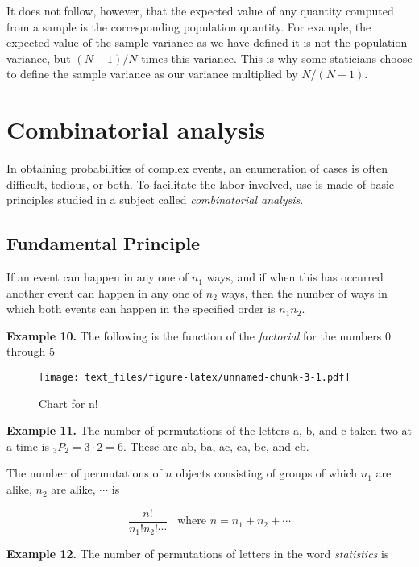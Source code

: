 \documentclass[
]{article}
\begin{document}
It does not follow, however, that the expected value of any quantity
computed from a sample is the corresponding population quantity. For
example, the expected value of the sample variance as we have defined it
is not the population variance, but \((N-1)/N\) times this variance.
This is why some staticians choose to define the sample variance as our
variance multiplied by \(N/(N-1)\).

\hypertarget{combinatorial-analysis}{%
\section{Combinatorial analysis}\label{combinatorial-analysis}}

In obtaining probabilities of complex events, an enumeration of cases is
often difficult, tedious, or both. To facilitate the labor involved, use
is made of basic principles studied in a subject called
\emph{combinatorial analysis}.

\hypertarget{fundamental-principle}{%
\subsection{Fundamental Principle}\label{fundamental-principle}}

If an event can happen in any one of \(n_1\) ways, and if when this has
occurred another event can happen in any one of \(n_2\) ways, then the
number of ways in which both events can happen in the specified order is
\(n_1 n_2\).

\textbf{Example 10.} The following is the function of the
\emph{factorial} for the numbers 0 through 5

\begin{figure}
\centering
\texttt{[image: text\_files/figure-latex/unnamed-chunk-3-1.pdf]}
\caption{Chart for n!}
\end{figure}

\textbf{Example 11.} The number of permutations of the letters a, b, and
c taken two at a time is \(_{3}P_{2} = 3 \cdot 2 = 6\). These are ab,
ba, ac, ca, bc, and cb.

The number of permutations of \(n\) objects consisting of groups of
which \(n_1\) are alike, \(n_2\) are alike, \(\cdots\) is

\begin{equation}
\frac{n!}{n_1! n_2! \cdots}\ \ \ \ \text{where } n = n_1 + n_2 + \cdots
\end{equation}

\textbf{Example 12.} The number of permutations of letters in the word
\emph{statistics} is
\end{document}
